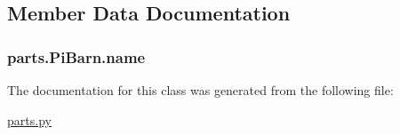 \subsection{Member Data Documentation}
\hypertarget{classparts_1_1_pi_barn_ae7facd5e416ec84a6b5943bdfcb348d6}{}
\subsubsection[{name}]{\setlength{\rightskip}{0pt plus 5cm}parts.\+Pi\+Barn.\+name}\label{classparts_1_1_pi_barn_ae7facd5e416ec84a6b5943bdfcb348d6}


The documentation for this class was generated from the following file\+:\begin{DoxyCompactItemize}
\item 
\hyperlink{parts_8py}{parts.\+py}\end{DoxyCompactItemize}
